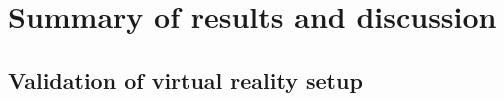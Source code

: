 \chapter{Summary of results and discussion}
\label{chap:res}

\section{Validation of virtual reality setup}
\blindtext[3]